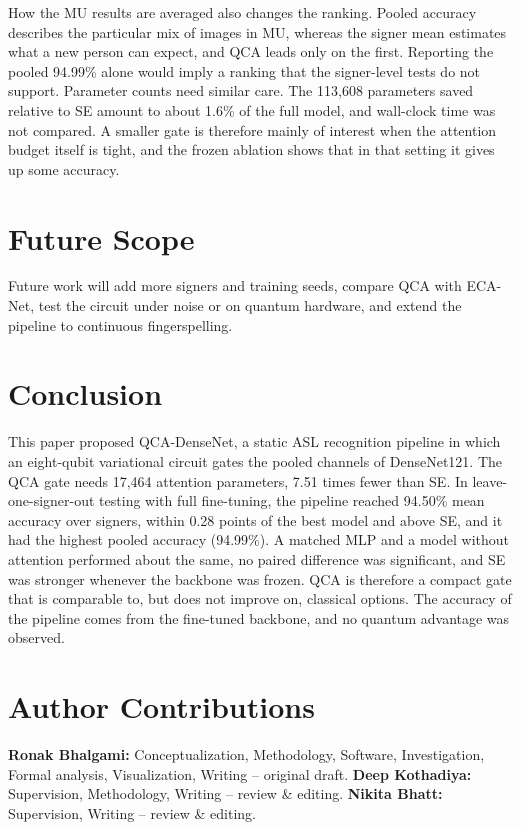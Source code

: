 \documentclass[10pt,twocolumn]{article}
\newcommand{\QCA}{QCA}
\begin{document}
How the MU results are averaged also changes the ranking. Pooled accuracy
describes the particular mix of images in MU, whereas the signer mean
estimates what a new person can expect, and \QCA{} leads only on the first.
Reporting the pooled 94.99\% alone would imply a ranking that the
signer-level tests do not support. Parameter counts need similar care. The 113,608
parameters saved relative to SE amount to about 1.6\% of the full model,
and wall-clock time was not compared. A smaller gate is therefore mainly
of interest when the attention budget itself is tight, and the frozen
ablation shows that in that setting it gives up some accuracy.

\section{Future Scope}
\label{sec:future}

Future work will add more signers and training seeds, compare \QCA{} with
ECA-Net, test the circuit under noise or on quantum hardware, and extend the
pipeline to continuous fingerspelling.

\FloatBarrier
\section{Conclusion}
\label{sec:conclusion}

This paper proposed QCA-DenseNet, a static ASL recognition pipeline in which
an eight-qubit variational circuit gates the pooled channels of DenseNet121.
The \QCA{} gate needs 17,464 attention parameters, 7.51 times fewer than SE.
In leave-one-signer-out testing with full fine-tuning, the pipeline reached
94.50\% mean accuracy over signers, within 0.28 points of the best model and
above SE, and it had the highest pooled accuracy (94.99\%). A matched MLP
and a model without attention performed about the same, no paired difference
was significant, and SE was stronger whenever the backbone was frozen.
\QCA{} is therefore a compact gate that is comparable to, but does not
improve on, classical options. The accuracy of the pipeline comes from the fine-tuned
backbone, and no quantum advantage was observed.

\section*{Author Contributions}
\textbf{Ronak Bhalgami:} Conceptualization, Methodology, Software,
Investigation, Formal analysis, Visualization, Writing -- original draft.
\textbf{Deep Kothadiya:} Supervision, Methodology, Writing -- review \&
editing. \textbf{Nikita Bhatt:} Supervision, Writing -- review \& editing.



\end{document}
